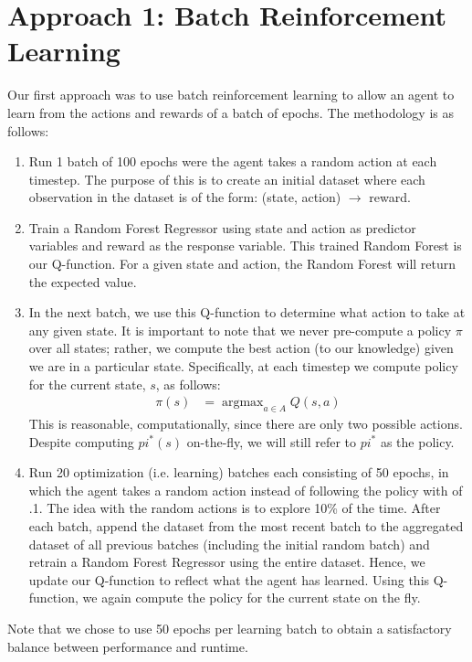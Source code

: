 \documentclass[11pt, oneside]{article}   	%
\DeclareMathOperator*{\argmax}{argmax} %
\begin{document}
\section{Approach 1: Batch Reinforcement Learning}
Our first approach was to use batch reinforcement learning to allow an agent to learn from the actions and rewards of a batch of epochs.  The methodology is as follows:
\begin{enumerate}
  \item Run 1 batch of 100 epochs were the agent takes a random action at each timestep.  The purpose of this is to create an initial dataset where each observation in the dataset is of the form: (state, action) $\longrightarrow$ reward.
  \item Train a Random Forest Regressor using state and action as predictor variables and reward as the response variable.  This trained Random Forest is our Q-function.  For a given state and action, the Random Forest will return the expected value.
  \item In the next batch, we use this Q-function to determine what action to take at any given state.  It is important to note that we never pre-compute a policy $\pi$ over all states; rather, we compute the best action (to our knowledge) given we are in a particular state.  Specifically, at each timestep we compute policy for the current state, $s$, as follows:
\begin{align}
\pi(s) &= \argmax_{a\in A} Q(s,a)
\end{align}
This is reasonable, computationally, since there are only two possible actions.  Despite computing $pi^*(s)$ on-the-fly, we will still refer to $pi^*$ as the policy.
  \item Run 20 optimization (i.e. learning) batches each consisting of 50 epochs, in which the agent takes a random action instead of following the policy with of .1. The idea with the random actions is to explore 10\% of the time.  After each batch, append the dataset from the most recent batch to the aggregated dataset of all previous batches (including the initial random batch) and retrain a Random Forest Regressor using the entire dataset.  Hence, we update our Q-function to reflect what the agent has learned.  Using this Q-function, we again compute the policy for the current state on the fly.
\end{enumerate}
Note that we chose to use 50 epochs per learning batch to obtain a satisfactory balance between performance and runtime.
\end{document}

